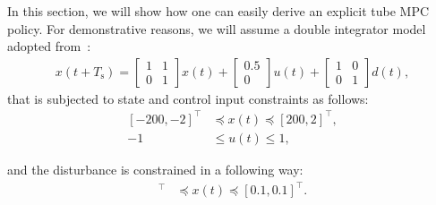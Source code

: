 \documentclass[letterpaper, 10 pt, conference]{ieeeconf}
\begin{document}
	In this section, we will show how one can easily derive an explicit tube MPC policy. For demonstrative reasons, we will assume a double integrator model adopted from~\cite{MS05}:
	\begin{eqnarray}
		\label{eq:example_system}
		x(t+T_\text{s}) = 
		\begin{bmatrix}
			1 & 1 \\
			0 & 1 
		\end{bmatrix} 
		x(t) + 
		\begin{bmatrix}
			0.5 \\
			0  
		\end{bmatrix}
		u(t) + 
		\begin{bmatrix}
			1 & 0 \\
			0 & 1 
		\end{bmatrix}
		d(t) ,
	\end{eqnarray}
	that is subjected to state and control input constraints as follows:
	\begin{subequations}
		\label{eq:example_system:cons}
		\begin{align}
			[-200, -2]^{\top} &\preceq x(t) \preceq [200, 2]^{\top}, \\
			-1 &\leq u(t) \leq 1,
		\end{align}
	\end{subequations}

	and the disturbance is constrained in a following way:
	\begin{eqnarray}
		[-0.1, -0.1]^{\top} &\preceq x(t) \preceq [0.1, 0.1]^{\top}.
	\end{eqnarray}


	
	
\end{document}
